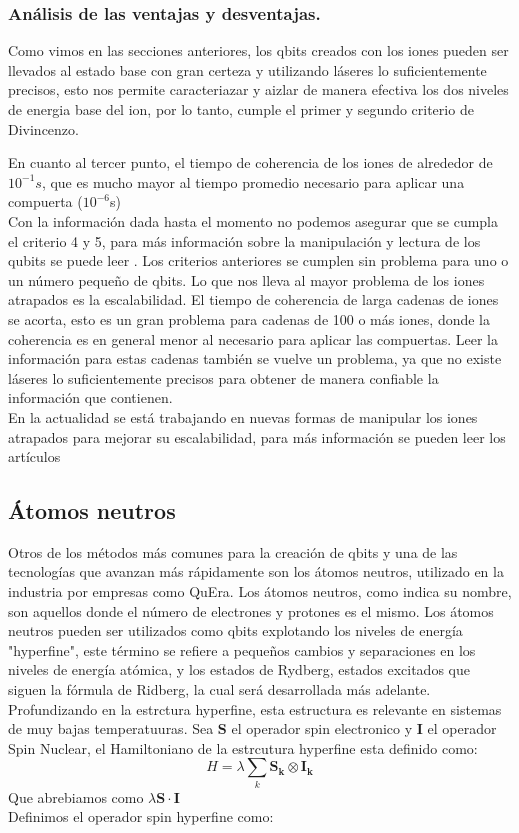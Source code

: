 \subsubsection{Análisis de las ventajas y desventajas.}

Como vimos en las secciones anteriores, los qbits creados con los iones pueden ser llevados al estado base con gran certeza y utilizando láseres lo suficientemente precisos, esto nos permite caracteriazar y aizlar de manera efectiva los dos niveles de energia base del ion, por lo tanto, cumple el primer y segundo criterio de Divincenzo.

En cuanto al tercer punto, el tiempo de coherencia de los iones de alrededor de $10^{-1}s$, que es mucho mayor al tiempo promedio necesario para aplicar una compuerta ($10^{-6}$s)\\
Con la información dada hasta el momento no podemos asegurar que se cumpla el criterio 4 y 5, para más información sobre la manipulación y lectura de los qubits se puede leer %
. Los criterios anteriores se cumplen sin problema para uno o un número pequeño de qbits. Lo que nos lleva al mayor problema de los iones atrapados es la escalabilidad.
El tiempo de coherencia de larga cadenas de iones se acorta, esto es un gran problema para cadenas de 100 o más iones, donde la coherencia es en general menor al necesario para aplicar las compuertas. Leer la información para estas cadenas también se vuelve un problema, ya que no existe láseres lo suficientemente precisos para obtener de manera confiable la información que contienen.\\
En la actualidad se está trabajando en nuevas formas de manipular los iones atrapados para mejorar su escalabilidad, para más información se pueden leer los artículos %

\subsection{Átomos neutros}

Otros de los métodos más comunes para la creación de qbits y una de las tecnologías que avanzan más rápidamente son los átomos neutros, utilizado en la industria por empresas como QuEra. Los átomos neutros, como indica su nombre, son aquellos donde el número de electrones y protones es el mismo. 
Los átomos neutros pueden ser utilizados como qbits explotando los niveles de energía "hyperfine", este término se refiere a pequeños cambios y separaciones en los niveles de energía atómica, y los estados de Rydberg, estados excitados que siguen la fórmula de Ridberg, la cual será desarrollada más adelante.\\
Profundizando en la estrctura hyperfine, esta estructura es relevante en sistemas de muy bajas temperatuuras. Sea $\mathbf{S}$ el operador spin electronico y $\mathbf{I}$ el operador Spin Nuclear, el Hamiltoniano de la estrcutura hyperfine esta definido como:
\begin{equation}
    H=\lambda\sum_{k}\mathbf{S_{k}}\otimes\mathbf{I_{k}}
\end{equation}
Que abrebiamos como $\lambda\mathbf{S}\cdot\mathbf{I}$\\
Definimos el operador spin hyperfine como:

